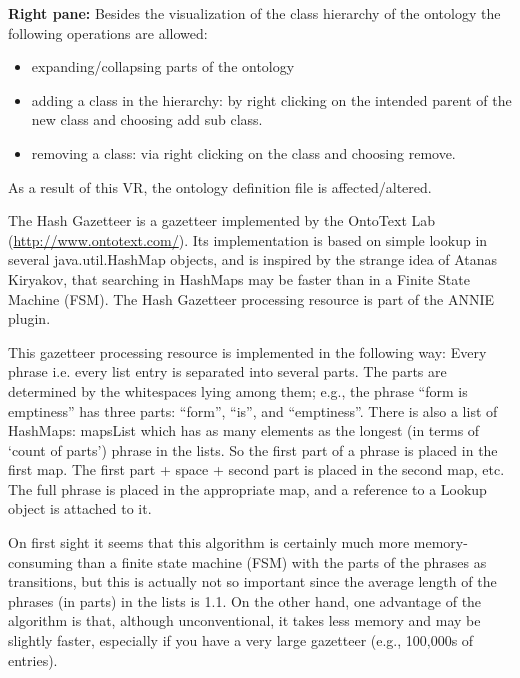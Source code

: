 \textbf{Right pane:} 
Besides the visualization of the class hierarchy of the
ontology the following operations are allowed: 
\begin{itemize}
\item expanding/collapsing parts of the ontology
\item adding a class in the hierarchy: by right clicking on the
intended parent of the new class and choosing add sub class. 
\item removing a class: via right clicking on the class and choosing
remove. 
\end{itemize}

As a result of this VR, the ontology definition file is
affected/altered. 

	

The Hash Gazetteer is a gazetteer implemented by the OntoText Lab
(\url{http://www.ontotext.com/}). Its implementation is based on simple lookup
in several java.util.HashMap objects, and is inspired by the strange idea of
Atanas Kiryakov, that searching in HashMaps may be faster than in a Finite State
Machine (FSM).  The Hash Gazetteer processing resource is part of the ANNIE
plugin.

This gazetteer processing resource is implemented in the following way: Every
phrase {i.e. every list entry} is separated into several parts. The parts are
determined by the whitespaces lying among them; e.g., the phrase ``form is
emptiness'' has three parts: ``form'', ``is'', and ``emptiness''.  There is also
a list of HashMaps: mapsList which has as many elements as the longest (in terms
of `count of parts') phrase in the lists. So the first part of a phrase is
placed in the first map. The first part + space + second part is placed in the
second map, etc. The full phrase is placed in the appropriate map, and a
reference to a Lookup object is attached to it.

On first sight it seems that this algorithm is certainly much more
memory-consuming than a finite state machine (FSM) with the parts of the phrases
as transitions, but this is actually not so important since the average length
of the phrases (in parts) in the lists is 1.1.  On the other hand, one advantage
of the algorithm is that, although unconventional, it takes less memory and may
be slightly faster, especially if you have a very large gazetteer (e.g.,
100,000s of entries).

